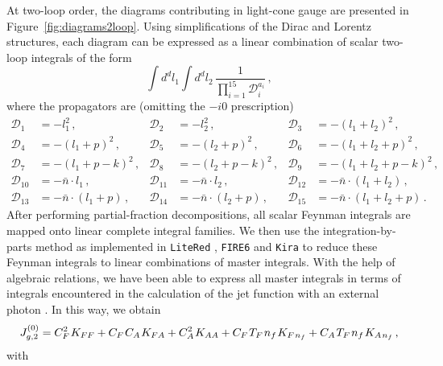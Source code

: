 \documentclass[12pt]{article}
\newcommand{\spac}{{\hspace{0.3mm}}}
\numberwithin{equation}{section}
\begin{document}
At two-loop order, the diagrams contributing in light-cone gauge are presented in Figure~\ref{fig:diagrams2loop}. Using simplifications of the Dirac and Lorentz structures, each diagram can be expressed as a linear combination of scalar two-loop integrals of the form
\begin{equation}
   \int d^dl_1 \int d^d l_2\,\frac{1}{\prod_{i=1}^{15} \mathcal{D}_i^{a_i}} \,,
\end{equation}
where the propagators are (omitting the $-i0$ prescription)
\begin{equation}
\begin{aligned}
   \mathcal{D}_1 &=-l_1^2 \,, & \mathcal{D}_2 &=-l_2^2 \,, & \mathcal{D}_3 &=-(l_1+l_2)^2 \,, \\
   \mathcal{D}_4 &=-(l_1+p)^2 \,, & \mathcal{D}_5 &=-(l_2+p)^2 \,, & \mathcal{D}_6 &=-(l_1+l_2+p)^2 \,, \\
   \mathcal{D}_7 &=-(l_1+p-k)^2 \,, & \mathcal{D}_8 &=-(l_2+p-k)^2 \,, & \mathcal{D}_9 &=-(l_1+l_2+p-k)^2 \,, \\ 
   \mathcal{D}_{10} &=-\bar{n}\cdot l_1 \,, & \mathcal{D}_{11} &=-\bar{n}\cdot l_2 \,,
    & \mathcal{D}_{12} &=-\bar{n}\cdot (l_1+l_2) \,, \\ 
   \mathcal{D}_{13} &=-\bar{n}\cdot (l_1+p) \,, & \mathcal{D}_{14} &=-\bar{n}\cdot ( l_2+p) \,,
    & \mathcal{D}_{15} &=-\bar{n}\cdot (l_1+l_2+p) \,.
\end{aligned}
\end{equation}
After performing partial-fraction decompositions, all scalar Feynman integrals are mapped onto linear complete integral families. We then use the integration-by-parts method as implemented in {\verb+LiteRed+} \cite{Lee:2013mka}, {\verb+FIRE6+} \cite{Smirnov:2019qkx} and {\verb+Kira+} \cite{Klappert:2020nbg} to reduce these Feynman integrals to linear combinations of master integrals. With the help of algebraic relations, we have been able to express all master integrals in terms of integrals encountered in the calculation of the jet function with an external photon \cite{Liu:2020ydl}. In this way, we obtain
\begin{equation}\label{eq:2.6}
   J_{g,2}^{(0)} = C_F^2\spac K_{FF} + C_F\spac C_A\spac K_{FA} + C_A^2\spac K_{AA} 
    + C_F\spac T_F\spac n_f\spac K_{F\spac n_f}+ C_A\spac T_F\spac n_f\spac K_{A\spac n_f} \,,
\end{equation}
with
\end{document}

